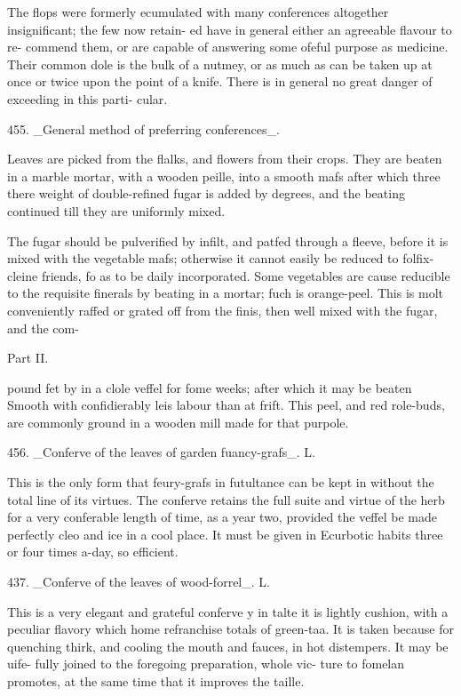 \documentclass{article}
\begin{document}
The flops were formerly ecumulated with many
conferences altogether insignificant; the few now retain-
ed have in general either an agreeable flavour to re-
commend them, or are capable of answering some
ofeful purpose as medicine. Their common dole is
the bulk of a nutmey, or as much as can be taken up
at once or twice upon the point of a knife. There is
in general no great danger of exceeding in this parti-
cular.

455. \_General method of preferring conferences\_.

Leaves are picked from the flalks, and flowers from
their crops. They are beaten in a marble mortar,
with a wooden peille, into a smooth mafs after
which three there weight of double-refined fugar is
added by degrees, and the beating continued till
they are uniformly mixed.

The fugar should be pulverified by infilt, and patfed
through a fleeve, before it is mixed with the vegetable
mafs; otherwise it cannot easily be reduced to folfix-
cleine friends, fo as to be daily incorporated. Some
vegetables are cause reducible to the requisite finerals
by beating in a mortar; fuch is orange-peel. This
is molt conveniently raffed or grated off from the
finis, then well mixed with the fugar, and the com-

Part II.

pound fet by in a clole veffel for fome weeks; after
which it may be beaten Smooth with confidierably leis
labour than at frift. This peel, and red role-buds,
are commonly ground in a wooden mill made for that
purpole.

456. \_Conferve of the leaves of garden fuancy-grafs\_. L.

This is the only form that feury-grafs in futultance
can be kept in without the total line of its virtues.
The conferve retains the full suite and virtue of the
herb for a very conferable length of time, as a year
two, provided the veffel be made perfectly cleo
and ice in a cool place. It must be given in Ecurbotic
habits three or four times a-day, so efficient.

437. \_Conferve of the leaves of wood-forrel\_. L.

This is a very elegant and grateful conferve y in
talte it is lightly cushion, with a peculiar flavory
which home refranchise totals of green-taa. It is taken
because for quenching thirk, and cooling the
mouth and fauces, in hot distempers. It may be uife-
fully joined to the foregoing preparation, whole vic-
ture to fomelan promotes, at the same time that it
improves the taille.
\end{document}
